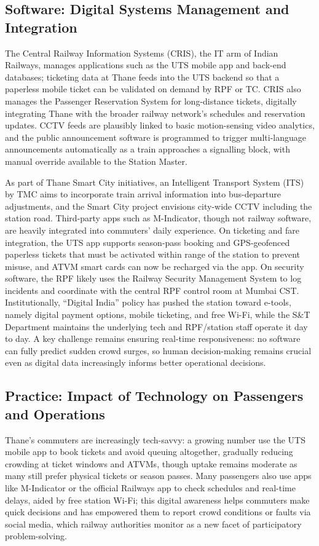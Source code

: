 \documentclass[11pt]{article}
\begin{document}
\subsection{Software: Digital Systems Management and Integration}

The Central Railway Information Systems (CRIS), the IT arm of Indian Railways, manages
applications such as the UTS mobile app and back-end databases; ticketing data at Thane feeds
into the UTS backend so that a paperless mobile ticket can be validated on demand by RPF or TC.
CRIS also manages the Passenger Reservation System for long-distance tickets, digitally
integrating Thane with the broader railway network's schedules and reservation updates.
CCTV feeds are plausibly linked to basic motion-sensing video analytics, and the public
announcement software is programmed to trigger multi-language announcements automatically as a
train approaches a signalling block, with manual override available to the Station Master.

As part of Thane Smart City initiatives, an Intelligent Transport System (ITS) by TMC aims to
incorporate train arrival information into bus-departure adjustments, and the Smart City project
envisions city-wide CCTV including the station road. Third-party apps such as M-Indicator,
though not railway software, are heavily integrated into commuters' daily experience. On
ticketing and fare integration, the UTS app supports season-pass booking and GPS-geofenced
paperless tickets that must be activated within range of the station to prevent misuse, and
ATVM smart cards can now be recharged via the app. On security software, the RPF likely uses the
Railway Security Management System to log incidents and coordinate with the central RPF control
room at Mumbai CST. Institutionally, ``Digital India'' policy has pushed the station toward
e-tools, namely digital payment options, mobile ticketing, and free Wi-Fi, while the S\&T
Department maintains the underlying tech and RPF/station staff operate it day to day. A key
challenge remains ensuring real-time responsiveness: no software can fully predict sudden crowd
surges, so human decision-making remains crucial even as digital data increasingly informs
better operational decisions.

\subsection{Practice: Impact of Technology on Passengers and Operations}

Thane's commuters are increasingly tech-savvy: a growing number use the UTS mobile app to book
tickets and avoid queuing altogether, gradually reducing crowding at ticket windows and ATVMs,
though uptake remains moderate as many still prefer physical tickets or season passes. Many
passengers also use apps like M-Indicator or the official Railways app to check schedules and
real-time delays, aided by free station Wi-Fi; this digital awareness helps commuters make quick
decisions and has empowered them to report crowd conditions or faults via social media, which
railway authorities monitor as a new facet of participatory problem-solving.
\end{document}
